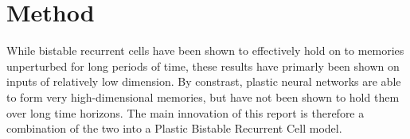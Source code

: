 \section{Method}

While bistable recurrent cells have been shown to effectively hold on to memories unperturbed for long periods of time, these results have primarly been shown on inputs of relatively low dimension. By constrast, plastic neural networks are able to form very high-dimensional memories, but have not been shown to hold them over long time horizons.
The main innovation of this report is therefore a combination of the two into a Plastic Bistable Recurrent Cell model. 

